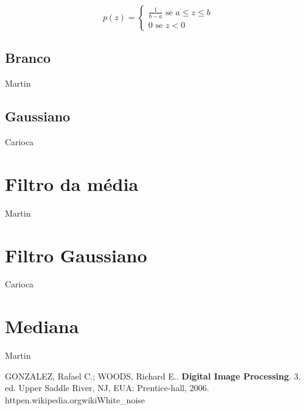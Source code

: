 \documentclass[10pt,a4paper]{article}
\begin{document}
\begin{equation}
p(z) = \left\{
    \begin{array}{l}
        \frac{1}{b - a} \text{ se } a \le z \le b \\
        0 \text{ se } z < 0
    \end{array}\right.
\end{equation}

\subsection{Branco}
Martin

\subsection{Gaussiano}
Carioca

\section{Filtro da média}
Martin

\section{Filtro Gaussiano}
Carioca

\section{Mediana}
Martin

\begin{thebibliography}{99}
     GONZALEZ, Rafael C.; WOODS, Richard E.. \textbf{Digital Image Processing}. 3. ed. Upper Saddle River, NJ, EUA: Prentice-hall, 2006.
     http\:\/\/en.wikipedia.org\/wiki\/White\_noise
\end{thebibliography}
\end{document}
